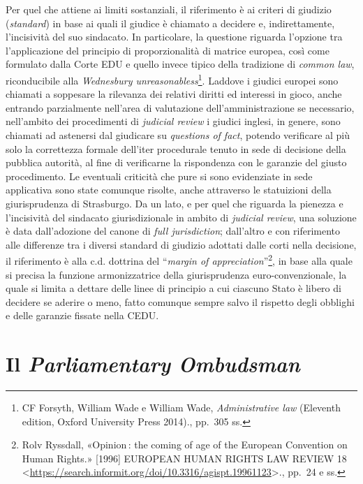 \documentclass[12pt,it,a4paper,]{report}
\begin{document}
Per quel che attiene ai limiti sostanziali, il riferimento è ai criteri
di giudizio (\emph{standard}) in base ai quali il giudice è chiamato a
decidere e, indirettamente, l'incisività del suo sindacato. In
particolare, la questione riguarda l'opzione tra l'applicazione del
principio di proporzionalità di matrice europea, così come formulato
dalla Corte EDU e quello invece tipico della tradizione di \emph{common
law}, riconducibile alla \emph{Wednesbury unreasonabless}\footnote{{CF
  Forsyth, William Wade e William Wade, \emph{Administrative law}
  (Eleventh edition, Oxford University Press 2014).}, pp.~305 ss.}.
Laddove i giudici europei sono chiamati a soppesare la rilevanza dei
relativi diritti ed interessi in gioco, anche entrando parzialmente
nell'area di valutazione dell'amministrazione se necessario, nell'ambito
dei procedimenti di \emph{judicial review} i giudici inglesi, in genere,
sono chiamati ad astenersi dal giudicare su \emph{questions of fact},
potendo verificare al più solo la correttezza formale dell'iter
procedurale tenuto in sede di decisione della pubblica autorità, al fine
di verificarne la rispondenza con le garanzie del giusto procedimento.
Le eventuali criticità che pure si sono evidenziate in sede applicativa
sono state comunque risolte, anche attraverso le statuizioni della
giurisprudenza di Strasburgo. Da un lato, e per quel che riguarda la
pienezza e l'incisività del sindacato giurisdizionale in ambito di
\emph{judicial review}, una soluzione è data dall'adozione del canone di
\emph{full jurisdiction}; dall'altro e con riferimento alle differenze
tra i diversi standard di giudizio adottati dalle corti nella decisione,
il riferimento è alla c.d. dottrina del ``\emph{margin of
appreciation}''\footnote{{Rolv Ryssdall, {«Opinion\,: the coming of age
  of the European Convention on Human Rights.»} {[}1996{]} EUROPEAN
  HUMAN RIGHTS LAW REVIEW 18
  \textless{}\url{https://search.informit.org/doi/10.3316/agispt.19961123}\textgreater.},
  pp.~24 e ss.}, in base alla quale si precisa la funzione
armonizzatrice della giurisprudenza euro-convenzionale, la quale si
limita a dettare delle linee di principio a cui ciascuno Stato è libero
di decidere se aderire o meno, fatto comunque sempre salvo il rispetto
degli obblighi e delle garanzie fissate nella CEDU.

\hypertarget{il-parliamentary-ombudsman}{%
\section{\texorpdfstring{Il \emph{Parliamentary
Ombudsman}}{Il Parliamentary Ombudsman}}\label{il-parliamentary-ombudsman}}
\end{document}

